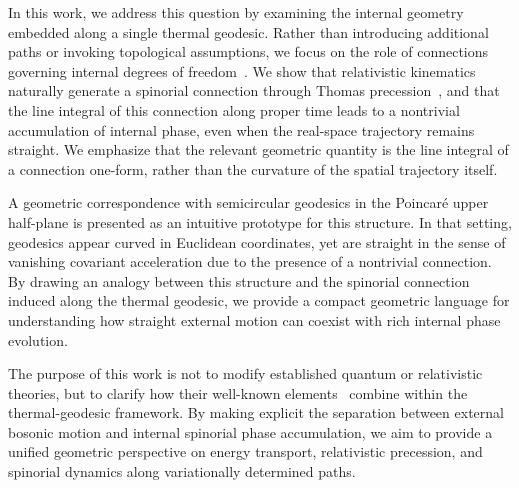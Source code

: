 \documentclass[%
 reprint,
 amsmath,amssymb,
 aps,
 prb,
]{revtex4-2}
\numberwithin{equation}{section}
\begin{document}
In this work, we address this question by examining the internal geometry embedded along a single thermal geodesic. Rather than introducing additional paths or invoking topological assumptions, we focus on the role of connections governing internal degrees of freedom~\cite{nakahara2003,aharonov1959}. We show that relativistic kinematics naturally generate a spinorial connection through Thomas precession~\cite{thomas1926,Jackson1999}, and that the line integral of this connection along proper time leads to a nontrivial accumulation of internal phase, even when the real-space trajectory remains straight. We emphasize that the relevant geometric quantity is the line integral of a connection one-form, rather than the curvature of the spatial trajectory itself.

A geometric correspondence with semicircular geodesics in the Poincar\'e upper half-plane is presented as an intuitive prototype for this structure. In that setting, geodesics appear curved in Euclidean coordinates, yet are straight in the sense of vanishing covariant acceleration due to the presence of a nontrivial connection. By drawing an analogy between this structure and the spinorial connection induced along the thermal geodesic, we provide a compact geometric language for understanding how straight external motion can coexist with rich internal phase evolution.

The purpose of this work is not to modify established quantum or relativistic theories, but to clarify how their well-known elements~\cite{bjorken1964,weinberg1995,ballentine1998} combine within the thermal-geodesic framework. By making explicit the separation between external bosonic motion and internal spinorial phase accumulation, we aim to provide a unified geometric perspective on energy transport, relativistic precession, and spinorial dynamics along variationally determined paths.
\end{document}
